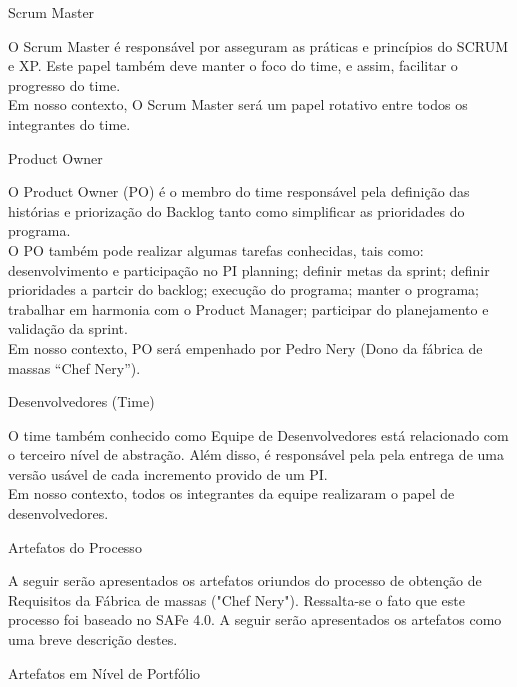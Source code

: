 {
	\large{Scrum Master\\}

	\tab O Scrum Master é responsável por asseguram as práticas e princípios do SCRUM e XP. Este papel também deve manter o foco do time, e assim, facilitar o progresso do time. \\
	\tab Em nosso contexto, O Scrum Master será um papel rotativo entre todos os integrantes do time. \\
}

{
	\large{Product Owner\\}

	\tab O Product Owner (PO) é o membro do time responsável pela definição das histórias e priorização do Backlog tanto como simplificar as prioridades do programa. \\
	\tab O PO também pode realizar algumas tarefas conhecidas, tais como: desenvolvimento e participação no PI planning; definir metas da sprint; definir prioridades  a partcir do backlog; execução do programa; manter o programa; trabalhar em harmonia com o Product Manager; participar do planejamento e validação da sprint. \\
	\tab Em nosso contexto, PO será empenhado por Pedro Nery (Dono da fábrica de massas “Chef Nery”). \\
}

{
	\large{Desenvolvedores (Time)\\}

	\tab O time também conhecido como Equipe de Desenvolvedores está relacionado com o terceiro nível de abstração. Além disso, é responsável pela pela entrega de uma versão usável de cada incremento provido de um PI. \\
	\tab Em nosso contexto, todos os integrantes da equipe realizaram o papel de desenvolvedores. \\

}

{
	\large{Artefatos do Processo \\}

	\tab A seguir serão apresentados os artefatos oriundos do processo de obtenção de Requisitos da Fábrica de massas ("Chef Nery"). Ressalta-se o fato que este processo foi baseado no SAFe 4.0. A seguir serão apresentados os artefatos como uma breve descrição destes. \\

}

{\large{Artefatos em Nível de Portfólio \\}}

